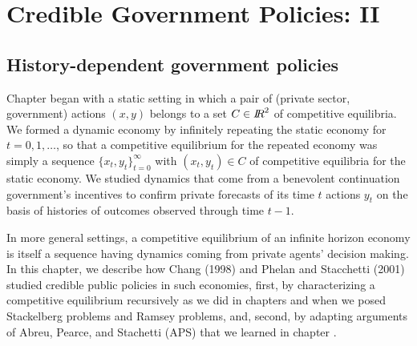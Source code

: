\chapter{Credible Government Policies: II\label{chang}}
\def\frac#1#2{{#1\over #2}}
{}
\section{History-dependent government policies}
Chapter 
 began
with a static setting in which a pair of (private sector, government) actions  $(x,y)$  belongs to a set $C \in {{I\kern-0.3em R}}^2$ of competitive equilibria.  We formed
a dynamic economy by infinitely repeating the static economy for $t =0, 1, \ldots $, so that  a competitive equilibrium for the repeated  economy was simply a sequence $\{x_t, y_t\}_{t=0}^\infty$ with $(x_t, y_t) \in C$  of competitive
  equilibria for the static economy.
   We
   studied dynamics that come from
     a benevolent continuation government's incentives to confirm private   forecasts of its time $t$
actions $y_t$
 on the basis of histories of outcomes observed through time $t-1$.


In more general  settings, a competitive equilibrium of an infinite horizon economy is  itself a  sequence having dynamics coming from private agents' decision making.
%
 In this chapter, we describe how Chang (1998) and Phelan and Stacchetti (2001) studied credible public policies in such economies, first, by  characterizing a competitive equilibrium
 recursively as we did in chapters  and   when we posed Stackelberg problems  and Ramsey problems, and, second, by   adapting
   arguments of Abreu, Pearce, and Stachetti (APS) that we learned in chapter .

